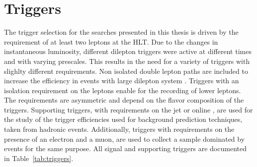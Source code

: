 \section{Triggers}\label{sec:trigger}
\noindent
\justify
The trigger selection for the searches presented in this thesis is driven by the requirement of at least two leptons at the HLT.
Due to the changes in instantaneous luminosity, different dilepton triggers were active at different times and with varying prescales. 
This results in the need for a variety of triggers with slighlty different requirements.
Non isolated double lepton paths are included to increase the efficiency in events with large dilepton system \pt. 
Triggers with an isolation requirement on the leptons enable for the recording of lower \pt leptons. 
The \pt requirements are asymmetric and depend on the flavor composition of the triggers.
Supporting triggers, with requirements on the jet \HT or online \ptmiss, are used for the study of the trigger efficiencies used for background prediction techniques, taken from hadronic events. 
Additionally, triggers with requirements on the presence of an electron and a muon, are used to collect a sample dominated by \ttbar events for the same purpose.
All signal and supporting triggers are documented in Table~\ref{tab:triggers}.                                                                                                        
